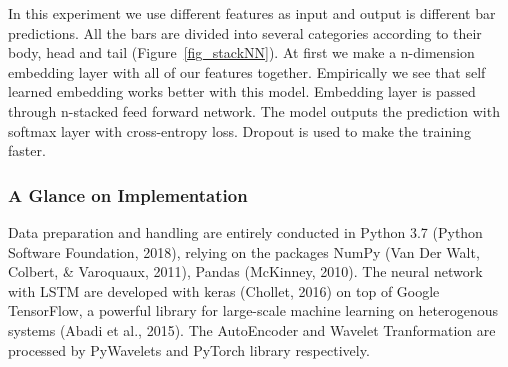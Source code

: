 In this experiment we use different features as input and output is different bar predictions. All the bars are divided into several categories according to their body, head and tail (Figure~\ref{fig_stackNN}). At first we make a n-dimension embedding layer with all of our features together. Empirically we see that self learned embedding works better with this model. Embedding layer is passed through n-stacked feed forward network. The model outputs the prediction with softmax layer with cross-entropy loss. Dropout is used to make the training faster.

\subsubsection{A Glance on Implementation  }

Data preparation and handling are entirely conducted in Python 3.7 (Python Software Foundation, 2018), relying on the packages NumPy (Van Der Walt, Colbert, & Varoquaux, 2011), Pandas (McKinney, 2010). The neural network with LSTM are developed with keras (Chollet, 2016) on top of Google TensorFlow, a powerful library for large-scale machine learning on heterogenous systems (Abadi et al., 2015). The AutoEncoder and Wavelet Tranformation are processed by PyWavelets and PyTorch library respectively.